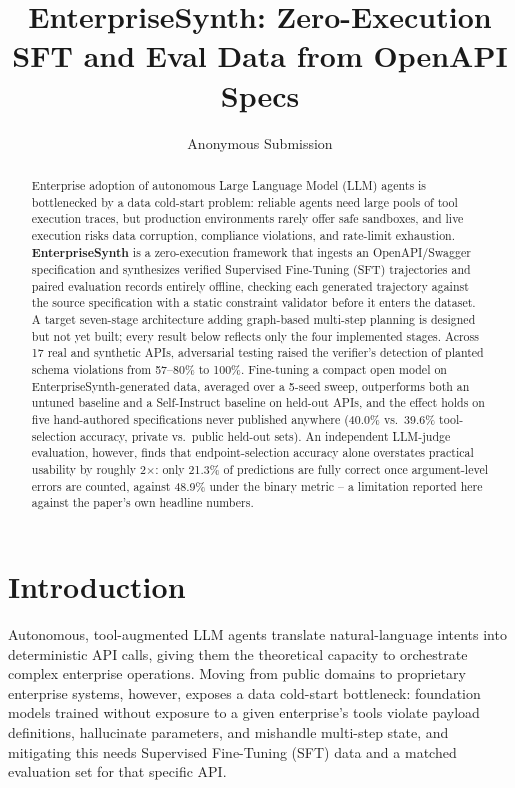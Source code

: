 \documentclass[letterpaper]{article} %
\title{EnterpriseSynth: Zero-Execution SFT and Eval Data from OpenAPI Specs}
\author{
    Anonymous Submission
}
\begin{document}
\maketitle

\begin{abstract}
Enterprise adoption of autonomous Large Language Model (LLM) agents is bottlenecked by a data
cold-start problem: reliable agents need large pools of tool execution traces, but production
environments rarely offer safe sandboxes, and live execution risks data corruption, compliance
violations, and rate-limit exhaustion. \textbf{EnterpriseSynth} is a zero-execution framework that
ingests an OpenAPI/Swagger specification and synthesizes verified Supervised Fine-Tuning (SFT)
trajectories and paired evaluation records entirely offline, checking each generated trajectory
against the source specification with a static constraint validator before it enters the dataset.
A target seven-stage architecture adding graph-based multi-step planning is designed but not yet
built; every result below reflects only the four implemented stages. Across 17 real and synthetic
APIs, adversarial testing raised the verifier's detection of planted schema violations from
57--80\% to 100\%. Fine-tuning a compact open model on EnterpriseSynth-generated data, averaged
over a 5-seed sweep, outperforms both an untuned baseline and a Self-Instruct baseline on held-out
APIs, and the effect holds on five hand-authored specifications never published anywhere (40.0\%
vs.\ 39.6\% tool-selection accuracy, private vs.\ public held-out sets). An independent LLM-judge
evaluation, however, finds that endpoint-selection accuracy alone overstates practical usability
by roughly 2$\times$: only 21.3\% of predictions are fully correct once argument-level errors are
counted, against 48.9\% under the binary metric -- a limitation reported here against the paper's
own headline numbers.
\end{abstract}

\section{Introduction}
Autonomous, tool-augmented LLM agents translate natural-language intents into deterministic API
calls, giving them the theoretical capacity to orchestrate complex enterprise operations. Moving
from public domains to proprietary enterprise systems, however, exposes a data cold-start
bottleneck: foundation models trained without exposure to a given enterprise's tools violate
payload definitions, hallucinate parameters, and mishandle multi-step state, and mitigating this
needs Supervised Fine-Tuning (SFT) data and a matched evaluation set for that specific API.
\end{document}
